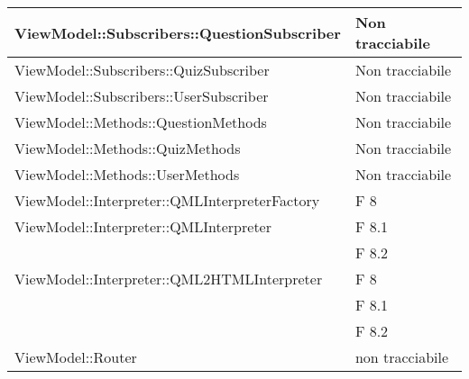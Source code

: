 \begin{longtable}{p{}p{}}

\midrule
ViewModel::Subscribers::QuestionSubscriber	& Non tracciabile\\
\midrule
ViewModel::Subscribers::QuizSubscriber	& Non tracciabile\\
\midrule
ViewModel::Subscribers::UserSubscriber	& Non tracciabile\\


\midrule
ViewModel::Methods::QuestionMethods	& Non tracciabile\\
\midrule
ViewModel::Methods::QuizMethods	& Non tracciabile\\
\midrule
ViewModel::Methods::UserMethods	& Non tracciabile\\


\midrule
ViewModel::Interpreter::QMLInterpreterFactory	& F 8\\
												
\midrule
ViewModel::Interpreter::QMLInterpreter	& F 8.1\\
										& F 8.2\\
\midrule
ViewModel::Interpreter::QML2HTMLInterpreter	& F 8\\
											& F 8.1\\
											& F 8.2\\
\midrule
ViewModel::Router							& non tracciabile\\
\midrule
							
	\end{longtable}			
	\newpage